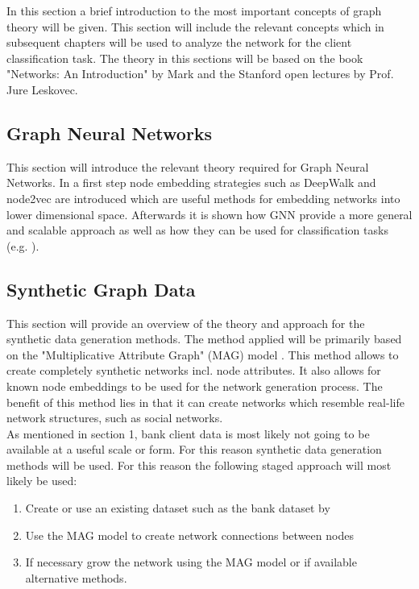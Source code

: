 \documentclass[12pt,a4paper]{article}
\begin{document}
	In this section a brief introduction to the most important concepts of graph theory will be given. This section will include the relevant concepts
	which in subsequent chapters will be used to analyze the network for the client classification task. The theory in this sections will be based on
	the book "Networks: An Introduction" by Mark \citet*{Newman2010} and the Stanford open lectures by Prof. Jure Leskovec. 
	
	\subsection{Graph Neural Networks}

	This section will introduce the relevant theory required for Graph Neural Networks. In a first step node embedding strategies such as 
	DeepWalk \citep{perozzi2014deepwalk} and node2vec \citep{grover2016node2vec} are introduced which are useful methods for embedding networks into 
	lower dimensional space. Afterwards it is shown how GNN provide a more general and scalable approach as well as how they can be used for 
	classification tasks (e.g. \citet{kipf2016semi}).

	\subsection{Synthetic Graph Data}

	This section will provide an overview of the theory and approach for the synthetic data generation methods. The method applied will be primarily
	based on the "Multiplicative Attribute Graph" (MAG) model \citep{kim2012multiplicative}. This method allows to create completely synthetic 
	networks incl. node attributes. It also allows for known node embeddings to be used for the network generation process. The benefit of this
	method lies in that it can create networks which resemble real-life network structures, such as social networks. \\

	\noindent As mentioned in section 1, bank client data is most likely not going to be available at a useful scale or form. For this reason 
	synthetic data generation methods will be used. For this reason the following staged approach will most likely be used:

	\begin{enumerate}
		\itemsep-0.5em
		\item Create or use an existing dataset such as the bank dataset by \citet{moro2014data}
		\item Use the MAG model to create network connections between nodes
		\item If necessary grow the network using the MAG model or if available alternative methods. 
	\end{enumerate}
	
\end{document}
